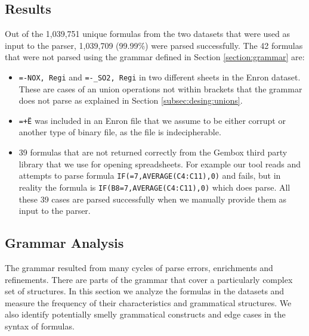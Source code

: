 \documentclass[conference]{IEEEtran}
\begin{document}
\subsection{Results}
Out of the 1,039,751 unique formulas from the two datasets that were used as input to the parser, 1,039,709 (99.99\%) were parsed successfully.
The 42 formulas that were not parsed using the grammar defined in Section \ref{section:grammar} are:

\begin{itemize}
	\item \texttt{=-NOX, Regi} and \texttt{=-_SO2, Regi} in two different sheets in the Enron dataset. These are cases of an union operations not within brackets that the grammar does not parse as explained in Section \ref{subsec:desing:unions}.
	\item \texttt{=+Ë\textperthousand} was included in an Enron file that we assume to be either corrupt or another type of binary file, as the file is indecipherable.
	\item 39 formulas that are not returned correctly from the Gembox third party library that we use for opening spreadsheets. For example our tool reads and attempts to parse formula \texttt{IF(=7,AVERAGE(C4:C11),0)} and fails, but in reality the formula is \texttt{IF(B8=7,AVERAGE(C4:C11),0)} which does parse. All these 39 cases are parsed successfully when we manually provide them as input to the parser.
\end{itemize}

\subsection{Grammar Analysis}
The grammar resulted from many cycles of parse errors, enrichments and refinements. There are parts of the grammar that cover a particularly complex set of structures. In this section we analyze the formulas in the datasets and measure the frequency of their characteristics and grammatical structures. We also identify potentially smelly grammatical constructs and edge cases in the syntax of formulas.
\end{document}

